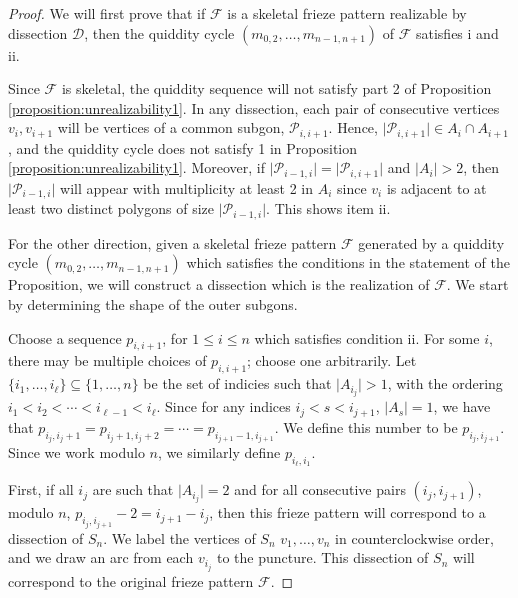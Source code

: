 \documentclass[12pt]{article}
\theoremstyle{remark}
\newcommand*{\F}{\mathcal{F}}
\newcommand*{\D}{\mathcal{D}}
\begin{document}
\begin{proof}
We will first prove that if $\F$ is a skeletal frieze pattern realizable by dissection $\D$, then the quiddity cycle $(m_{0,2},\ldots,m_{n-1,n+1})$ of $\F$ satisfies i and ii. 

Since $\F$ is skeletal, the quiddity sequence will not satisfy part 2 of Proposition \ref{proposition:unrealizability1}.  In any dissection, each pair of consecutive vertices $v_i, v_{i+1}$ will be vertices of a common subgon, $\mathcal{P}_{i,i+1}$. Hence, $\vert \mathcal{P}_{i,i+1}\vert \in A_i \cap A_{i+1}$, and the quiddity cycle does not satisfy 1 in Proposition \ref{proposition:unrealizability1}. Moreover, if $\vert \mathcal{P}_{i-1,i}\vert = \vert \mathcal{P}_{i,i+1}\vert$ and $\vert A_i \vert > 2$, then $\vert \mathcal{P}_{i-1,i}\vert$ will appear with multiplicity at least 2 in $A_i$ since $v_i$ is adjacent to at least two distinct polygons of size $\vert \mathcal{P}_{i-1,i}\vert$. This shows item ii.

For the other direction, given a skeletal frieze pattern $\F$  generated by a quiddity cycle $(m_{0,2},\ldots,m_{n-1,n+1})$ which satisfies the conditions in the statement of the Proposition, we will construct a dissection which is the realization of $\F$. We start by determining the shape of the outer subgons.

Choose a sequence $p_{i,i+1}$, for $1 \leq i \leq n$ which satisfies condition ii. For some $i$, there may be multiple choices of $p_{i,i+1}$; choose one arbitrarily. 
Let $\{i_1,\ldots,i_\ell\} \subseteq \{1,\ldots,n\}$ be the set of indicies such that $\vert A_{i_j}\vert > 1$, with the ordering $i_1 < i_2 < \cdots < i_{\ell - 1} < i_\ell $. Since for any indices $i_j < s < i_{j+1}$, $\vert A_s \vert = 1$, we have that $p_{i_j, i_j+1} = p_{i_j+1,i_j+2} = \cdots = p_{i_{j+1}-1,i_{j+1}}$. We define this number to be $p_{i_j,i_{j+1}}$. Since we work modulo $n$, we similarly define $p_{i_\ell,i_1}.$

First, if all $i_j$ are such that $\vert A_{i_j} \vert = 2$ and for all consecutive pairs $(i_j,i_{j+1})$, modulo $n$, $p_{i_j,i_{j+1}} -2  = i_{j+1} - i_j$, then this frieze pattern will correspond to a dissection of $S_n$.  We label the vertices of $S_n$ $v_1,\ldots,v_n$ in counterclockwise order, and we draw an arc from each $v_{i_j}$ to the puncture.  This dissection of $S_n$ will correspond to the original frieze pattern $\F$. 


\end{proof}
\end{document}
